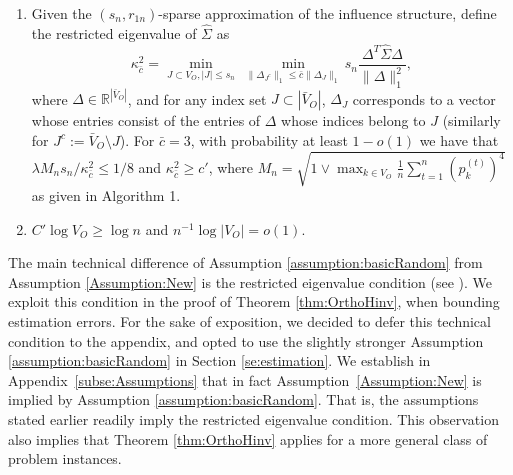 \documentclass[opre,nonblindrev]{informs3} %
\begin{document}
\begin{APPENDIX}{}
\begin{assumption}
\begin{enumerate}[label=\roman*.]
	   \item 
Given the $(s_n,r_{1n})$-sparse approximation of the influence structure,
define the restricted eigenvalue of $\hat{\Sigma}$ as
\begin{equation} \label{eq:kappaCond}
\kappa^2_{\bar c} = \min_{J \subset V_O, |J|\leq s_n}~ \min_{\|{\Delta}_{J^c}\|_1\leq \bar c\|\Delta_J\|_1} s_n\frac{\Delta^T\hat{\Sigma} \Delta}{\|\Delta\|_1^2}, 
\end{equation}
	    where $\Delta\in \mathbb{R}^{|\bar{V}_O|}$, and for any index set $J\subset |\bar{V}_O|$, 
	    $\Delta_J$ corresponds to a vector whose entries consist of the entries of $\Delta$ whose indices belong to $J$ (similarly for $J^c:= \bar{V}_O \setminus J$).
	    For $\bar{c} = 3$,
	    with probability at least $1-o(1)$
	    we have that
	    $\lambda M_n s_n /\kappa^2_{\bar{c}} \leq  1/8$ and
	     $\kappa^2_{\bar c} \geq c'$,
	     where $M_n = \sqrt{ 1\vee \max_{k\in V_O}\frac{1}{n}\sum_{t=1}^n(p_k^{(t)})^4 }$  as given in Algorithm 1.
	   \label{ass7.3}
	 
	     \item {$ C' \log V_O \geq  \log n$ and $n^{-1} \log |V_O| = o(1)$.}
	         
	     	\label{ass7.4}
	     
\end{enumerate}
\end{assumption}
{The main technical 
difference of Assumption  \ref{assumption:basicRandom}
from Assumption \ref{Assumption:New}
 is the restricted eigenvalue condition
(see \citet{BickelRitovTsybakov2009}).
 We exploit this condition  in the proof of Theorem
\ref{thm:OrthoHinv}, when bounding estimation errors.
For the sake of exposition,
 we decided to defer 
  this technical condition
 to the appendix, and opted to use the slightly stronger Assumption \ref{assumption:basicRandom} in Section \ref{se:estimation}.
We establish in Appendix~\ref{subse:Assumptions} that in fact
Assumption~\ref{Assumption:New} is implied by Assumption \ref{assumption:basicRandom}.  That is, the assumptions stated earlier readily imply the restricted eigenvalue condition. This observation also implies that Theorem \ref{thm:OrthoHinv} applies for a more general class of problem instances.

}
\end{APPENDIX}
\end{document}
